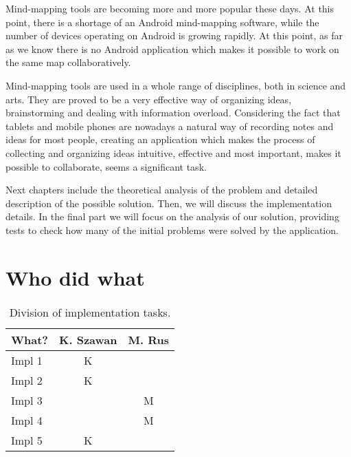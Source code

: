 
Mind-mapping tools are becoming more and more popular these days. At this point, there is a shortage of an Android mind-mapping software, while the number of devices operating on Android is growing rapidly. At this point, as far as we know there is no Android application which makes it possible to work on the same map collaboratively.


Mind-mapping tools are used in a whole range of disciplines, both in science and arts. They are proved to be a very effective way of organizing ideas, brainstorming and dealing with information overload. Considering the fact that tablets and mobile phones are nowadays a natural way of recording notes and ideas for most people, creating an application which makes the process of collecting and organizing ideas intuitive, effective and most important, makes it possible to collaborate, seems a significant task.


Next chapters include the theoretical analysis of the problem and detailed description of the possible solution. Then, we will discuss the implementation details. In the final part we will focus on the analysis of our solution, providing tests to check how many of the initial problems were solved by the application.

\section{Who did what}
\label{sec:who-did-what}


\begin{table}[h]
	\centering
	\begin{tabular}{l|c|c}
		What? & K. Szawan & M. Rus \\
		\hline
		Impl 1 & K & \\
		Impl 2 & K & \\
		Impl 3 & & M\\
		Impl 4 & & M\\
		Impl 5 & K & \\
	\end{tabular}
	\caption{Division of implementation tasks.}
	\label{tab:who-did-impl}
\end{table}

